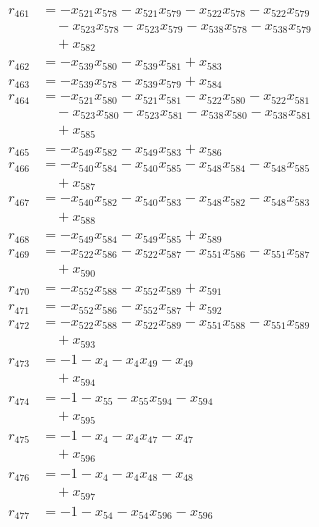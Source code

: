 \begin{align*}
r_{461} &= -x_{521} x_{578} - x_{521} x_{579} - x_{522} x_{578} - x_{522} x_{579} \\
&\quad{}- x_{523} x_{578} - x_{523} x_{579} - x_{538} x_{578} - x_{538} x_{579} \\
&\quad{}+ x_{582} \\
r_{462} &= -x_{539} x_{580} - x_{539} x_{581} + x_{583} \\
r_{463} &= -x_{539} x_{578} - x_{539} x_{579} + x_{584} \\
r_{464} &= -x_{521} x_{580} - x_{521} x_{581} - x_{522} x_{580} - x_{522} x_{581} \\
&\quad{}- x_{523} x_{580} - x_{523} x_{581} - x_{538} x_{580} - x_{538} x_{581} \\
&\quad{}+ x_{585} \\
r_{465} &= -x_{549} x_{582} - x_{549} x_{583} + x_{586} \\
r_{466} &= -x_{540} x_{584} - x_{540} x_{585} - x_{548} x_{584} - x_{548} x_{585} \\
&\quad{}+ x_{587} \\
r_{467} &= -x_{540} x_{582} - x_{540} x_{583} - x_{548} x_{582} - x_{548} x_{583} \\
&\quad{}+ x_{588} \\
r_{468} &= -x_{549} x_{584} - x_{549} x_{585} + x_{589} \\
r_{469} &= -x_{522} x_{586} - x_{522} x_{587} - x_{551} x_{586} - x_{551} x_{587} \\
&\quad{}+ x_{590} \\
r_{470} &= -x_{552} x_{588} - x_{552} x_{589} + x_{591} \\
r_{471} &= -x_{552} x_{586} - x_{552} x_{587} + x_{592} \\
r_{472} &= -x_{522} x_{588} - x_{522} x_{589} - x_{551} x_{588} - x_{551} x_{589} \\
&\quad{}+ x_{593} \\
r_{473} &= -1 - x_{4} - x_{4} x_{49} - x_{49} \\
&\quad{}+ x_{594} \\
r_{474} &= -1 - x_{55} - x_{55} x_{594} - x_{594} \\
&\quad{}+ x_{595} \\
r_{475} &= -1 - x_{4} - x_{4} x_{47} - x_{47} \\
&\quad{}+ x_{596} \\
r_{476} &= -1 - x_{4} - x_{4} x_{48} - x_{48} \\
&\quad{}+ x_{597} \\
r_{477} &= -1 - x_{54} - x_{54} x_{596} - x_{596} \\

\end{align*}
